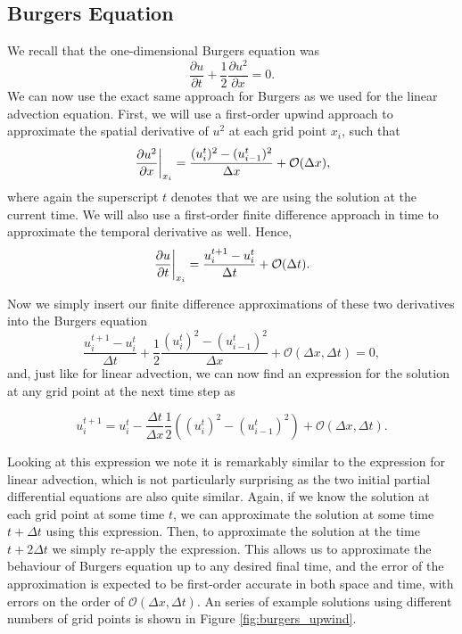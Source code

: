 \subsection{Burgers Equation}
We recall that the one-dimensional Burgers equation was
\begin{equation}
	\frac{\partial u}{\partial t} +  \frac{1}{2} \frac{\partial u^2}{\partial x} = 0.
\end{equation}
We can now use the exact same approach for Burgers as we used for the linear advection equation. First, we will use a first-order upwind approach to approximate the spatial derivative of $u^2$ at each grid point $x_i$, such that
\begin{equation}
	\left.\frac{\partial u^2}{\partial x}\right\rvert_{x_i}^{} = \frac{(u_i^t)^2 - (u_{i-1}^t)^2}{\Delta x} + \mathcal{O}(\Delta x),
\end{equation}
where again the superscript $t$ denotes that we are using the solution at the current time. We will also use a first-order finite difference approach in time to approximate the temporal derivative as well. Hence,
\begin{equation}
	\left.\frac{\partial u}{\partial t}\right\rvert_{x_i}^{} = \frac{u_i^{t+1} - u_{i}^t}{\Delta t} + \mathcal{O}(\Delta t).
\end{equation}

Now we simply insert our finite difference approximations of these two derivatives into the Burgers equation
\begin{equation}
	\frac{u_i^{t+1} - u_{i}^t}{\Delta t} +  \frac{1}{2}\frac{(u_i^t)^2 - (u_{i-1}^t)^2}{\Delta x} + \mathcal{O}(\Delta x, \Delta t) = 0,
\end{equation}
and, just like for linear advection, we can now find an expression for the solution at any grid point at the next time step as
\begin{eqBox}
\begin{equation}
	u_i^{t+1} = u_{i}^t - \frac{\Delta t}{\Delta x} \frac{1}{2}\left( \left(u_i^t \right)^2 - \left( u_{i-1}^t \right)^2 \right) + \mathcal{O}(\Delta x, \Delta t).
	\label{eq:fd_burgers}
\end{equation}
\end{eqBox}
Looking at this expression we note it is remarkably similar to the expression for linear advection, which is not particularly surprising as the two initial partial differential equations are also quite similar. Again, if we know the solution at each grid point at some time $t$, we can approximate the solution at some time $t+\Delta t$ using this expression. Then, to approximate the solution at the time $t+2\Delta t$ we simply re-apply the expression. This allows us to approximate the behaviour of Burgers equation up to any desired final time, and the error of the approximation is expected to be first-order accurate in both space and time, with errors on the order of $\mathcal{O}(\Delta x, \Delta t)$. An series of example solutions using different numbers of grid points is shown in Figure \ref{fig:burgers_upwind}.

